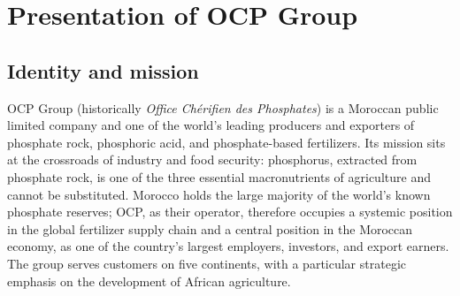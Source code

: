 \documentclass[11pt,a4paper]{report}
\begin{document}
\chapter{Presentation of OCP Group}
\label{ch:company}

\section{Identity and mission}
OCP Group (historically \emph{Office Ch\'erifien des Phosphates}) is a
Moroccan public limited company and one of the world's leading producers and
exporters of phosphate rock, phosphoric acid, and phosphate-based
fertilizers. Its mission sits at the crossroads of industry and food
security: phosphorus, extracted from phosphate rock, is one of the three
essential macronutrients of agriculture and cannot be substituted. Morocco
holds the large majority of the world's known phosphate reserves; OCP, as
their operator, therefore occupies a systemic position in the global
fertilizer supply chain and a central position in the Moroccan economy, as
one of the country's largest employers, investors, and export earners. The
group serves customers on five continents, with a particular strategic
emphasis on the development of African agriculture.
\end{document}
